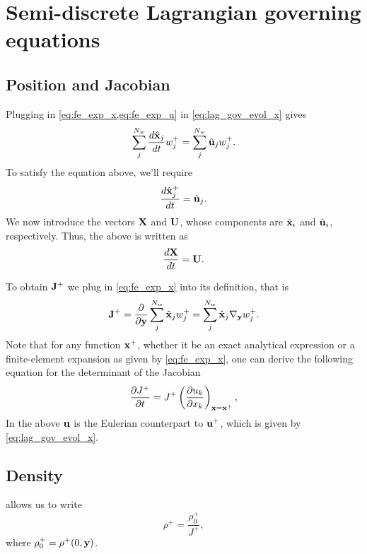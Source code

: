 \documentclass[11pt]{article}
\begin{document}
\section{Semi-discrete Lagrangian governing equations}
\subsection{Position and Jacobian}
Plugging in \cref{eq:fe_exp_x,eq:fe_exp_u} in \cref{eq:lag_gov_evol_x} gives
\begin{equation}
    \sum_{j}^{N_w} \frac{d \hat{\mathbf{x}}_j}{dt} w^+_j = \sum_{j}^{N_w} \hat{\mathbf{u}}_j w^+_j.
\end{equation}
To satisfy the equation above, we'll require
\begin{equation}
    \frac{d \hat{\mathbf{x}}^+_j}{dt} = \hat{\mathbf{u}}_j.
\end{equation}
We now introduce the vectors $\mathbf{X}$ and $\mathbf{U}$, whose components are $\hat{\mathbf{x}}_i$ and $\hat{\mathbf{u}}_i$, respectively. Thus, the above is written as
\begin{equation}
    \frac{d\mathbf{X}}{dt} = \mathbf{U}.
\end{equation}

To obtain $\mathbf{J}^+$ we plug in \cref{eq:fe_exp_x} into its definition, that is
\begin{equation}
    \mathbf{J}^+ = \frac{\partial}{\partial \mathbf{y}} \sum_j^{N_w} \hat{\mathbf{x}}_j w^+_j = \sum_j^{N_w} \hat{\mathbf{x}}_j \nabla_{\mathbf{y}} w^+_j.
\end{equation}
Note that for any function $\mathbf{x}^+$, whether it be an exact analytical expression or a finite-element expansion as given by \cref{eq:fe_exp_x}, one can derive the following equation for the determinant of the Jacobian 
\begin{equation}
    \frac{\partial J^+}{\partial t} = J^+ \left ( \frac{\partial u_k}{\partial x_k} \right )_{\mathbf{x} = \mathbf{x}^+},
\end{equation}
In the above $\mathbf{u}$ is the Eulerian counterpart to $\mathbf{u}^+$, which is given by \cref{eq:lag_gov_evol_x}.

\subsection{Density}
 allows us to write
\begin{equation}
    \label{eq:evol_rho_semi_discrete}
    \rho^+ = \frac{\rho^+_0}{J^+},
\end{equation}
where $\rho^+_0 = \rho^+(0,\mathbf{y})$.
\end{document}
